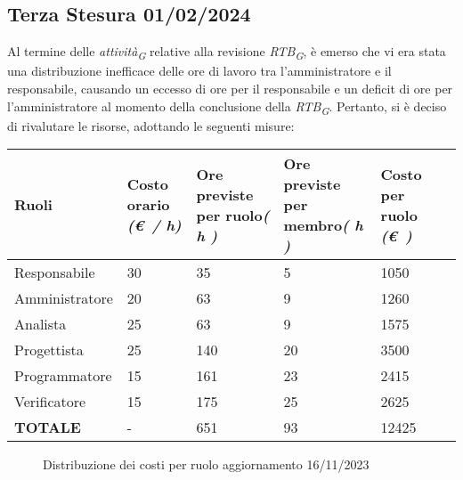 \subsection{Terza Stesura 01/02/2024}\label{sec:TerzaStesura}
Al termine delle \textit{attività}\textsubscript{\textit{G}} relative alla revisione \textit{RTB}\textsubscript{\textit{G}}, è emerso che vi era stata una distribuzione inefficace delle ore di lavoro tra l'amministratore e il responsabile, causando un eccesso di ore per il responsabile e un deficit di ore per l'amministratore al momento della conclusione della \textit{RTB}\textsubscript{\textit{G}}. Pertanto, si è deciso di rivalutare le risorse, adottando le seguenti misure:
\begin{center}
    \begin{tabular}{|C{3cm}|C{2cm}|C{2cm}|C{2cm}|C{2cm}|C{2cm}|}
        \hline

        \textbf{Ruoli}  & \textbf{Costo orario} \linebreak \textit{(\euro\ / h)} & \textbf{Ore previste per ruolo}\linebreak \textit{( h )} & \textbf{Ore previste per membro}\linebreak \textit{( h )} & \textbf{Costo per ruolo} \linebreak \textit{(\euro\ )} \\
        \hline\hline

        Responsabile & 30 & 35 & 5 & 1050 \\
        \hline
        Amministratore & 20 & 63 & 9 & 1260 \\
        \hline
        Analista & 25 & 63 & 9 & 1575 \\
        \hline
        Progettista & 25 & 140 & 20 & 3500 \\
        \hline
        Programmatore & 15 & 161 & 23 & 2415 \\
        \hline
        Verificatore & 15 & 175 & 25 & 2625 \\
        \hline\hline

        \textbf{TOTALE} & - & 651 & 93 & 12425 \\
        \hline
    \end{tabular}
\end{center}
\begin{figure}[H]
    \centering
    \caption{Distribuzione dei costi per ruolo aggiornamento 16/11/2023}
\end{figure}
